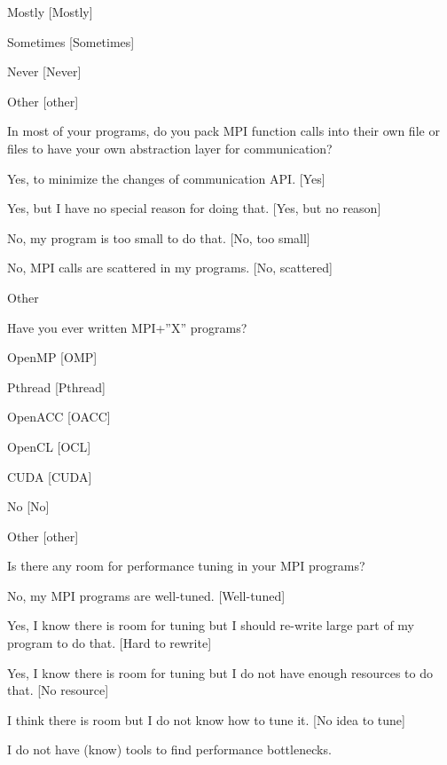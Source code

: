 \documentclass[conference,10pt,letterpaper]{IEEEtran}
\begin{document}
{{\begin{description}
\begin{inparaenum}[{\bf C}1)]
    \item Mostly [Mostly]
    \item Sometimes [Sometimes]
    \item Never [Never]
    \item Other [other]
    \end{inparaenum}
  \item[Q21:] In most of your programs, do you pack MPI function calls into their own file or files to have your own abstraction layer for communication?
    \begin{inparaenum}[{\bf C}1)]
    \item Yes, to minimize the changes of communication API. [Yes]
    \item Yes, but I have no special reason for doing that. [Yes, but no reason]
    \item No, my program is too small to do that. [No, too small]
    \item No, MPI calls are scattered in my programs. [No, scattered]
    \item Other
    \end{inparaenum}
  \item[Q22*:] Have you ever written MPI+”X” programs?
    \begin{inparaenum}[{\bf C}1)]
    \item OpenMP [OMP]
    \item Pthread [Pthread]
    \item OpenACC [OACC]
    \item OpenCL [OCL]
    \item CUDA [CUDA]
    \item No [No]
    \item Other [other]
    \end{inparaenum}
  \item[Q23:] Is there any room for performance tuning in your MPI programs?
    \begin{inparaenum}[{\bf C}1)]
    \item No, my MPI programs are well-tuned. [Well-tuned]
    \item Yes, I know there is room for tuning but I should re-write large
      part of my program to do that. [Hard to rewrite]
    \item Yes, I know there is room for tuning but I do not have enough resources to do that.
      [No resource]
    \item I think there is room but I do not know how to tune it.
      [No idea to tune]
    \item I do not have (know) tools to find performance bottlenecks.

\end{inparaenum}
\end{description}}}
\end{document}
